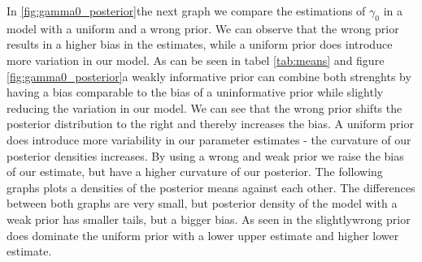 In \ref{fig:gamma0_posterior}the next graph we compare the estimations of $\gamma_0$ in a model with a uniform and a wrong prior. We can observe that the wrong prior results in a higher bias in the estimates, while a uniform prior does introduce more variation in our model.
As can be seen in tabel \ref{tab:means} and figure \ref{fig:gamma0_posterior}a weakly informative prior can combine both strenghts by having a bias comparable to the bias of a uninformative prior while slightly reducing the variation in our model.
We can see that the wrong prior shifts the posterior distribution to the right and thereby increases the bias. A uniform prior does introduce more variability in our parameter estimates - the curvature of our posterior densities increases.
By using a wrong and weak prior we raise the bias of our estimate, but have a higher curvature of our posterior. The following graphs plots a densities of the posterior means against each other. The differences between both graphs are very small, but posterior density of the model with a weak prior has smaller tails, but a bigger bias. As seen in  the slightlywrong prior does dominate the uniform prior with a lower upper estimate and higher lower estimate.


